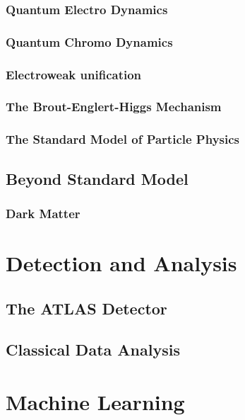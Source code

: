 \documentclass[14pt, a4paper]{book}
\begin{document}
\subsection{Quantum Electro Dynamics}

\subsection{Quantum Chromo Dynamics}


\subsection{Electroweak unification}


\subsection{The Brout-Englert-Higgs Mechanism}


\subsection{The Standard Model of Particle Physics}


\section{Beyond Standard Model}

\subsection{Dark Matter}



\chapter{Detection and Analysis}


\section{The ATLAS Detector}


\section{Classical Data Analysis}



\chapter{Machine Learning}
\end{document}
